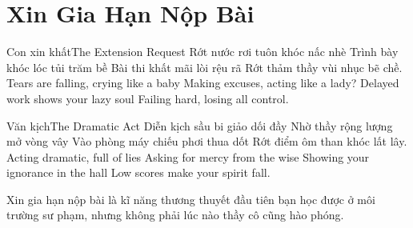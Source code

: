 \chapter{Xin Gia Hạn Nộp Bài}

\begin{tutuyetbox}{Con xin khất}{The Extension Request}
Rớt nước rơi tuôn khóc nấc nhè
Trình bày khóc lóc tủi trăm bề
Bài thi khất mãi lòi rệu rã
Rớt thảm thầy vùi nhục bẽ chề.
\tcblower
Tears are falling, crying like a baby 
Making excuses, acting like a lady? 
Delayed work shows your lazy soul 
Failing hard, losing all control.
\end{tutuyetbox}

\begin{tutuyetbox}{Văn kịch}{The Dramatic Act}
Diễn kịch sầu bi giảo dối đầy
Nhờ thầy rộng lượng mở vòng vây
Vào phòng máy chiếu phơi thua dốt
Rớt điểm ôm than khóc lất lây.
\tcblower
Acting dramatic, full of lies 
Asking for mercy from the wise 
Showing your ignorance in the hall 
Low scores make your spirit fall.
\end{tutuyetbox}

\begin{ghichu}
Xin gia hạn nộp bài là kĩ năng thương thuyết đầu tiên bạn học được ở môi trường sư phạm, nhưng không phải lúc nào thầy cô cũng hào phóng.
\end{ghichu}